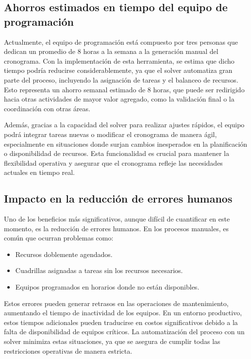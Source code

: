 \documentclass{article}
\begin{document}
\subsection{Ahorros estimados en tiempo del equipo de programación}

Actualmente, el equipo de programación está compuesto por tres personas que dedican un promedio de 8 horas a la semana a la generación manual del cronograma. Con la implementación de esta herramienta, se estima que dicho tiempo podría reducirse considerablemente, ya que el solver automatiza gran parte del proceso, incluyendo la asignación de tareas y el balanceo de recursos. Esto representa un ahorro semanal estimado de 8 horas, que puede ser redirigido hacia otras actividades de mayor valor agregado, como la validación final o la coordinación con otras áreas.

Además, gracias a la capacidad del solver para realizar ajustes rápidos, el equipo podrá integrar tareas nuevas o modificar el cronograma de manera ágil, especialmente en situaciones donde surjan cambios inesperados en la planificación o disponibilidad de recursos. Esta funcionalidad es crucial para mantener la flexibilidad operativa y asegurar que el cronograma refleje las necesidades actuales en tiempo real.

\subsection{Impacto en la reducción de errores humanos}

Uno de los beneficios más significativos, aunque difícil de cuantificar en este momento, es la reducción de errores humanos. En los procesos manuales, es común que ocurran problemas como:
\begin{itemize}
    \item Recursos doblemente agendados.
    \item Cuadrillas asignadas a tareas sin los recursos necesarios.
    \item Equipos programados en horarios donde no están disponibles.
\end{itemize}

Estos errores pueden generar retrasos en las operaciones de mantenimiento, aumentando el tiempo de inactividad de los equipos. En un entorno productivo, estos tiempos adicionales pueden traducirse en costos significativos debido a la falta de disponibilidad de equipos críticos. La automatización del proceso con un solver minimiza estas situaciones, ya que se asegura de cumplir todas las restricciones operativas de manera estricta.
\end{document}
